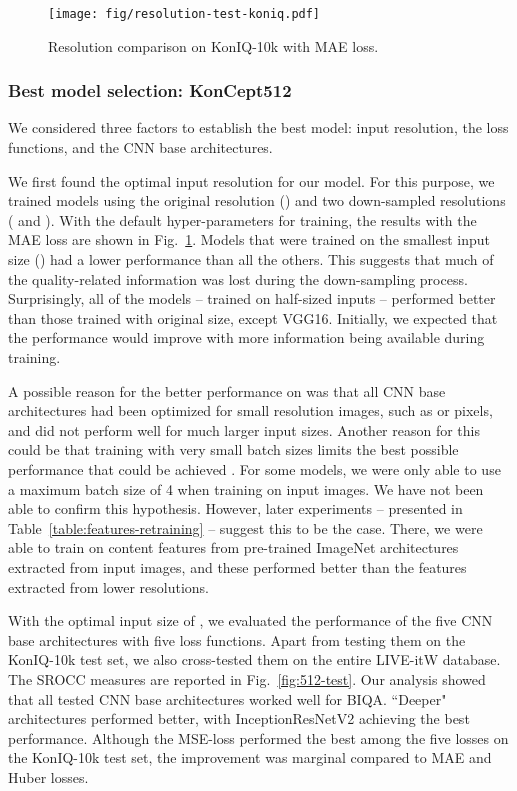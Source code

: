 \documentclass[10pt,journal,compsoc]{IEEEtran}
\begin{document}
\begin{figure}[!t]
\centering
\vspace{-5pt}
\texttt{[image: fig/resolution-test-koniq.pdf]}
\caption{Resolution comparison on KonIQ-10k with MAE loss.}
\label{fig:resolution-test-koniq}
\vspace{-0pt}
\end{figure}

\subsubsection{Best model selection: KonCept512}
We considered three factors to establish the best model: input resolution, the loss functions, and the CNN base architectures.

We first found the optimal input resolution for our model. For this purpose, we trained models using the original resolution () and two down-sampled resolutions ( and ). With the default hyper-parameters for training, the results with the MAE loss are shown in Fig.~\ref{fig:resolution-test-koniq}.
Models that were trained on the smallest input size ()  had a lower performance than all the others. This suggests that much of the quality-related information was lost during the down-sampling process. Surprisingly, all of the models -- trained on half-sized inputs -- performed better than those trained with original size, except VGG16. Initially, we expected that the performance would improve with more information being available during training. 

A possible reason for the better performance on  was that all CNN base architectures had been optimized for small resolution images, such as  or  pixels, and did not perform well for much larger input sizes.  Another reason for this could be that training with very small batch sizes limits the best possible performance that could be achieved \cite{keskar2016large}. For some models, we were only able to use a maximum batch size of 4 when training on  input images. We have not been able to confirm this hypothesis. However, later experiments -- presented in Table~\ref{table:features-retraining} -- suggest this to be the case. There, we were able to train on content features from pre-trained ImageNet architectures extracted from  input images, and these performed better than the features extracted from lower resolutions.

With the optimal input size of , we evaluated the performance of the five CNN base architectures with five loss functions. Apart from testing them on the KonIQ-10k test set, we also cross-tested them on the entire LIVE-itW database. The SROCC measures are reported in Fig.~\ref{fig:512-test}.
Our analysis showed that all tested CNN base architectures worked well for BIQA. ``Deeper" architectures performed better, with InceptionResNetV2 achieving the best performance. Although the MSE-loss performed the best among the five losses on the KonIQ-10k test set, the improvement was marginal compared to MAE and Huber losses.
\end{document}
